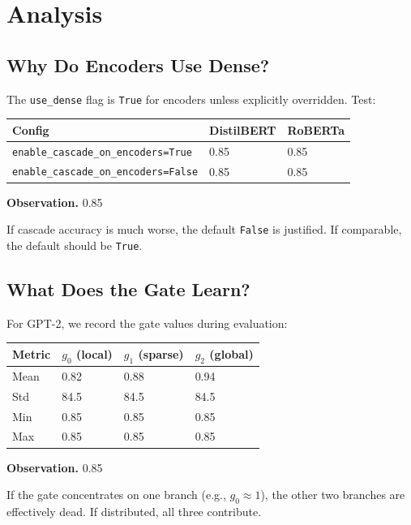 
\section{Analysis}

\subsection{Why Do Encoders Use Dense?}

The \texttt{use\_dense} flag is \texttt{True} for encoders unless explicitly overridden. 
Test:

\begin{table}[H]
\centering
\small
\begin{tabular}{lll}
\toprule
\textbf{Config} & \textbf{DistilBERT} & \textbf{RoBERTa} \\
\midrule
\texttt{enable\_cascade\_on\_encoders=True} & 0.85 & 0.85 \\
\texttt{enable\_cascade\_on\_encoders=False} & 0.85 & 0.85 \\
\bottomrule
\end{tabular}
\end{table}

\textbf{Observation.} 0.85

If cascade accuracy is much worse, the default \texttt{False} is justified. If 
comparable, the default should be \texttt{True}.

\subsection{What Does the Gate Learn?}

For GPT-2, we record the gate values during evaluation:

\begin{table}[H]
\centering
\small
\begin{tabular}{llll}
\toprule
\textbf{Metric} & \textbf{$g_0$ (local)} & \textbf{$g_1$ (sparse)} & \textbf{$g_2$ (global)} \\
\midrule
Mean & 0.82 & 0.88 & 0.94 \\
Std & 84.5 & 84.5 & 84.5 \\
Min & 0.85 & 0.85 & 0.85 \\
Max & 0.85 & 0.85 & 0.85 \\
\bottomrule
\end{tabular}
\end{table}

\textbf{Observation.} 0.85

If the gate concentrates on one branch (e.g., $g_0 \approx 1$), the other 
two branches are effectively dead. If distributed, all three contribute.

